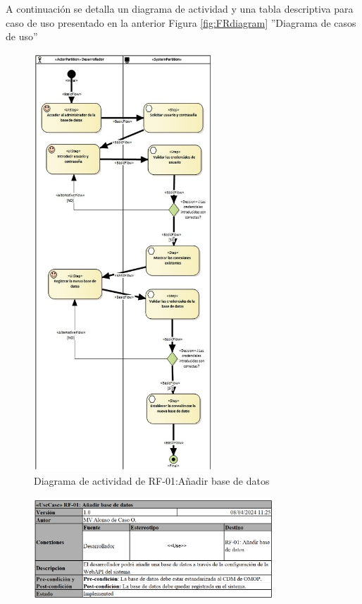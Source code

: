 A continuación se detalla un diagrama de actividad y una tabla descriptiva para caso de uso presentado en la anterior Figura \ref{fig:FRdiagram} ''Diagrama de casos de uso''

\begin{figure}[H]
    \centering
    \includegraphics[width=0.60\textwidth]{figures/FR01.jpg}
    \caption{Diagrama de actividad de RF-01:Añadir base de datos}
    \label{fig:FR01}
\end{figure}

\begin{figure}[H]
    \centering
    \includegraphics[width=0.80\textwidth]{tables/RF01tab.png}
    \label{table:RF01tab}
\end{figure}

